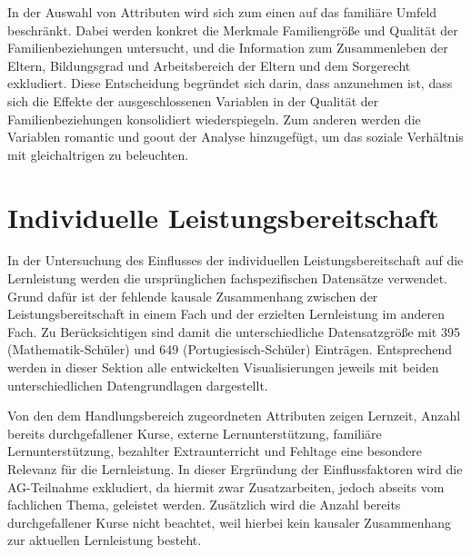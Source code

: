 In der Auswahl von Attributen wird sich zum einen auf das familiäre Umfeld beschränkt. 
Dabei werden konkret die Merkmale Familiengröße und Qualität der Familienbeziehungen untersucht, und die Information zum Zusammenleben der Eltern, Bildungsgrad und Arbeitsbereich der Eltern und dem Sorgerecht exkludiert.
Diese Entscheidung begründet sich darin, dass anzunehmen ist, dass sich die Effekte der ausgeschlossenen Variablen in der Qualität der Familienbeziehungen konsolidiert wiederspiegeln.
Zum anderen werden die Variablen romantic und goout der Analyse hinzugefügt, um das soziale Verhältnis mit gleichaltrigen zu beleuchten.

\section{Individuelle Leistungsbereitschaft}

In der Untersuchung des Einflusses der individuellen Leistungsbereitschaft auf die Lernleistung werden die ursprünglichen fachspezifischen Datensätze verwendet.
Grund dafür ist der fehlende kausale Zusammenhang zwischen der Leistungsbereitschaft in einem Fach und der erzielten Lernleistung im anderen Fach.
Zu Berücksichtigen sind damit die unterschiedliche Datensatzgröße mit 395 (Mathematik-Schüler) und 649 (Portugiesisch-Schüler) Einträgen.
Entsprechend werden in dieser Sektion alle entwickelten Visualisierungen jeweils mit beiden unterschiedlichen Datengrundlagen dargestellt.

Von den dem Handlungsbereich zugeordneten Attributen zeigen Lernzeit, Anzahl bereits durchgefallener Kurse, externe Lernunterstützung, familiäre Lernunterstützung, bezahlter Extraunterricht und Fehltage eine besondere Relevanz für die Lernleistung. 
In dieser Ergründung der Einflussfaktoren wird die AG-Teilnahme exkludiert, da hiermit zwar Zusatzarbeiten, jedoch abseits vom fachlichen Thema, geleistet werden.
Zusätzlich wird die Anzahl bereits durchgefallener Kurse nicht beachtet, weil hierbei kein kausaler Zusammenhang zur aktuellen Lernleistung besteht.

